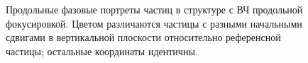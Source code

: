 \begin{figure}[h]\centering
	\caption{Продольные фазовые портреты частиц в структуре с ВЧ продольной фокусировкой. Цветом различаются частицы с разными начальными сдвигами в вертикальной плоскости относительно референсной частицы; остальные координаты идентичны.}
\end{figure}

